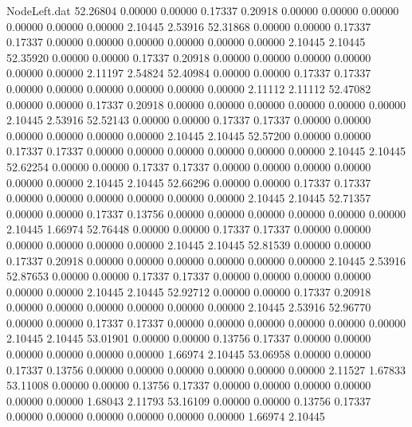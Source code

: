 \begin{filecontents}{NodeLeft.dat}
  52.26804    0.00000    0.00000     0.17337    0.20918    0.00000    0.00000    0.00000    0.00000    0.00000    0.00000    2.10445    2.53916
  52.31868    0.00000    0.00000     0.17337    0.17337    0.00000    0.00000    0.00000    0.00000    0.00000    0.00000    2.10445    2.10445
  52.35920    0.00000    0.00000     0.17337    0.20918    0.00000    0.00000    0.00000    0.00000    0.00000    0.00000    2.11197    2.54824
  52.40984    0.00000    0.00000     0.17337    0.17337    0.00000    0.00000    0.00000    0.00000    0.00000    0.00000    2.11112    2.11112
  52.47082    0.00000    0.00000     0.17337    0.20918    0.00000    0.00000    0.00000    0.00000    0.00000    0.00000    2.10445    2.53916
  52.52143    0.00000    0.00000     0.17337    0.17337    0.00000    0.00000    0.00000    0.00000    0.00000    0.00000    2.10445    2.10445
  52.57200    0.00000    0.00000     0.17337    0.17337    0.00000    0.00000    0.00000    0.00000    0.00000    0.00000    2.10445    2.10445
  52.62254    0.00000    0.00000     0.17337    0.17337    0.00000    0.00000    0.00000    0.00000    0.00000    0.00000    2.10445    2.10445
  52.66296    0.00000    0.00000     0.17337    0.17337    0.00000    0.00000    0.00000    0.00000    0.00000    0.00000    2.10445    2.10445
  52.71357    0.00000    0.00000     0.17337    0.13756    0.00000    0.00000    0.00000    0.00000    0.00000    0.00000    2.10445    1.66974
  52.76448    0.00000    0.00000     0.17337    0.17337    0.00000    0.00000    0.00000    0.00000    0.00000    0.00000    2.10445    2.10445
  52.81539    0.00000    0.00000     0.17337    0.20918    0.00000    0.00000    0.00000    0.00000    0.00000    0.00000    2.10445    2.53916
  52.87653    0.00000    0.00000     0.17337    0.17337    0.00000    0.00000    0.00000    0.00000    0.00000    0.00000    2.10445    2.10445
  52.92712    0.00000    0.00000     0.17337    0.20918    0.00000    0.00000    0.00000    0.00000    0.00000    0.00000    2.10445    2.53916
  52.96770    0.00000    0.00000     0.17337    0.17337    0.00000    0.00000    0.00000    0.00000    0.00000    0.00000    2.10445    2.10445
  53.01901    0.00000    0.00000     0.13756    0.17337    0.00000    0.00000    0.00000    0.00000    0.00000    0.00000    1.66974    2.10445
  53.06958    0.00000    0.00000     0.17337    0.13756    0.00000    0.00000    0.00000    0.00000    0.00000    0.00000    2.11527    1.67833
  53.11008    0.00000    0.00000     0.13756    0.17337    0.00000    0.00000    0.00000    0.00000    0.00000    0.00000    1.68043    2.11793
  53.16109    0.00000    0.00000     0.13756    0.17337    0.00000    0.00000    0.00000    0.00000    0.00000    0.00000    1.66974    2.10445

\end{filecontents}
